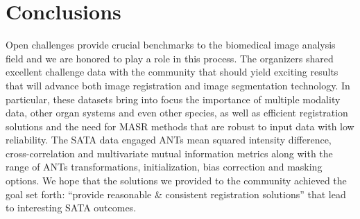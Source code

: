 \documentclass{llncs}
\begin{document}
\section{Conclusions}
Open challenges provide crucial benchmarks to the biomedical image
analysis field and we are honored to play a role in this process.  The
organizers shared excellent challenge data with the community that
should yield exciting results that will advance both
image registration and image segmentation technology.  In particular,
these datasets bring into focus the importance of multiple modality
data, other organ systems and even other species, as well as efficient
registration solutions and the need for MASR methods that are robust
to input data with low reliability.  The SATA data engaged ANTs mean
squared intensity difference, cross-correlation and multivariate
mutual information metrics along with the range of ANTs
transformations, initialization, bias correction and masking options.
We hope that the solutions we provided to the community achieved the
goal set forth: ``provide reasonable \& consistent registration
solutions'' that lead to interesting SATA outcomes.



\end{document}
